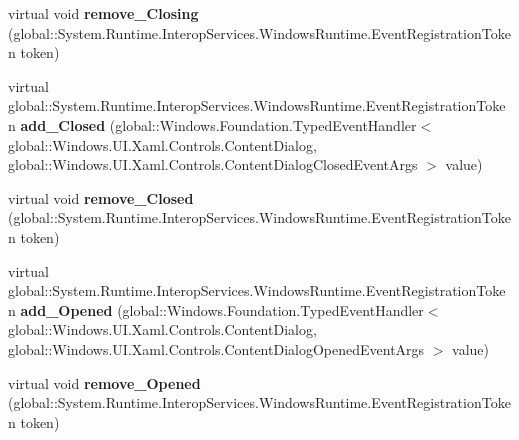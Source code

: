 \begin{DoxyCompactItemize}
\item 
\mbox{\label{class_windows_1_1_u_i_1_1_xaml_1_1_controls_1_1_content_dialog_a13479534a17ee5bc6c49534a00724ca9}} 
virtual void {\bfseries remove\+\_\+\+Closing} (global\+::\+System.\+Runtime.\+Interop\+Services.\+Windows\+Runtime.\+Event\+Registration\+Token token)
\item 
\mbox{\label{class_windows_1_1_u_i_1_1_xaml_1_1_controls_1_1_content_dialog_a6211ece9675f87d6eff022d36ec839af}} 
virtual global\+::\+System.\+Runtime.\+Interop\+Services.\+Windows\+Runtime.\+Event\+Registration\+Token {\bfseries add\+\_\+\+Closed} (global\+::\+Windows.\+Foundation.\+Typed\+Event\+Handler$<$ global\+::\+Windows.\+U\+I.\+Xaml.\+Controls.\+Content\+Dialog, global\+::\+Windows.\+U\+I.\+Xaml.\+Controls.\+Content\+Dialog\+Closed\+Event\+Args $>$ value)
\item 
\mbox{\label{class_windows_1_1_u_i_1_1_xaml_1_1_controls_1_1_content_dialog_aa69d94be955777eb910008418fd76375}} 
virtual void {\bfseries remove\+\_\+\+Closed} (global\+::\+System.\+Runtime.\+Interop\+Services.\+Windows\+Runtime.\+Event\+Registration\+Token token)
\item 
\mbox{\label{class_windows_1_1_u_i_1_1_xaml_1_1_controls_1_1_content_dialog_a140644918023f750ab438dadf16adbc6}} 
virtual global\+::\+System.\+Runtime.\+Interop\+Services.\+Windows\+Runtime.\+Event\+Registration\+Token {\bfseries add\+\_\+\+Opened} (global\+::\+Windows.\+Foundation.\+Typed\+Event\+Handler$<$ global\+::\+Windows.\+U\+I.\+Xaml.\+Controls.\+Content\+Dialog, global\+::\+Windows.\+U\+I.\+Xaml.\+Controls.\+Content\+Dialog\+Opened\+Event\+Args $>$ value)
\item 
\mbox{\label{class_windows_1_1_u_i_1_1_xaml_1_1_controls_1_1_content_dialog_aca373dad7a49f1f4e1bd7b41f5ea7703}} 
virtual void {\bfseries remove\+\_\+\+Opened} (global\+::\+System.\+Runtime.\+Interop\+Services.\+Windows\+Runtime.\+Event\+Registration\+Token token)
\item 
\mbox{\label{class_windows_1_1_u_i_1_1_xaml_1_1_controls_1_1_content_dialog_a3e36b19b3f4893d9fb0f02a0521e5d93}} 

\end{DoxyCompactItemize}
